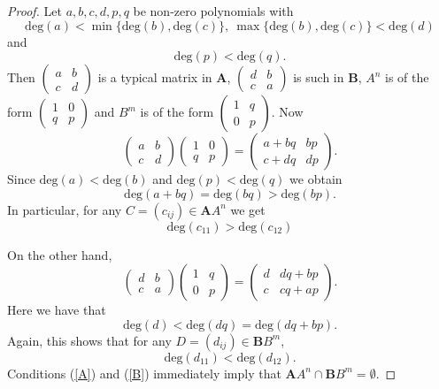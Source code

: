 \documentclass[11pt,reqno]{amsart}
\theoremstyle{remark}
\begin{document}
\begin{proof} Let $a,b,c,d,p,q$ be non-zero polynomials with
$$\mathrm{deg}(a)<\min\{\mathrm{deg}(b),\mathrm{deg}(c)\},\ \max\{\mathrm{deg}(b),\mathrm{deg}(c)\}<\mathrm{deg}(d)$$
and
$$\mathrm{deg}(p)<\mathrm{deg}(q).$$
Then
$\left(\begin{smallmatrix} a& b\\ c & d\end{smallmatrix}\right)$ is a
typical matrix in $\mathbf{A}$, $\left(\begin{smallmatrix} d& b\\ c &
a\end{smallmatrix}\right)$ is such in $\mathbf{B}$, $A^n$ is of the form
$\left(\begin{smallmatrix} 1 & 0\\q  & p\end{smallmatrix}\right)$
and $B^m$ is of the form $\left(\begin{smallmatrix} 1 & q\\0 &
p\end{smallmatrix}\right)$. Now
$$\begin{pmatrix} a & b\\c & d\end{pmatrix} \begin{pmatrix}1 &0\\ q
& p\end{pmatrix} =\begin{pmatrix} a+bq& bp\\ c+dq&
dp\end{pmatrix}.$$ Since $\mathrm{deg}(a)<\mathrm{deg}(b)$ and
$\mathrm{deg}(p)<\mathrm{deg}(q)$ we obtain
$$\mathrm{deg}(a+bq)=\mathrm{deg}(bq)> \mathrm{deg}(bp).$$
In particular, for any $C=(c_{ij})\in\mathbf{A}A^n$ we get
\begin{equation}\label{A}
\mathrm{deg}(c_{11})>\mathrm{deg}(c_{12})
\end{equation}

On the other hand,
$$\begin{pmatrix} d & b\\c & a\end{pmatrix} \begin{pmatrix}1 &q\\
0 & p\end{pmatrix} =\begin{pmatrix} d& dq+bp\\
c&cq+ap\end{pmatrix}.$$ Here we have that
$$\mathrm{deg}(d)<\mathrm{deg}(dq)=
\mathrm{deg}(dq+bp).$$  Again, this shows that for any $D=(d_{ij})\in\mathbf{B}B^m$,
\begin{equation}\label{B}
\mathrm{deg}(d_{11})<\mathrm{deg}(d_{12}).
\end{equation}
Conditions (\ref{A}) and (\ref{B}) immediately imply that $\mathbf{A}A^n\cap \mathbf{B}B^m=\emptyset$.
\end{proof}
\end{document}
